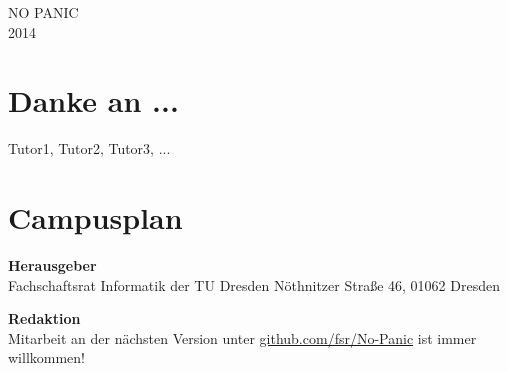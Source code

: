 \documentclass[12pt]{article}
\begin{document}
NO PANIC \\
2014
\newpage


\tableofcontents


\section{Danke an ...}

Tutor1, Tutor2, Tutor3, ...


















\section{Campusplan}



\newpage
\textbf{Herausgeber} \\
Fachschaftsrat Informatik der TU Dresden
Nöthnitzer Straße 46, 01062 Dresden

\textbf{Redaktion} \\

Mitarbeit an der nächsten Version unter \url{github.com/fsr/No-Panic} ist immer willkommen!
\end{document}
